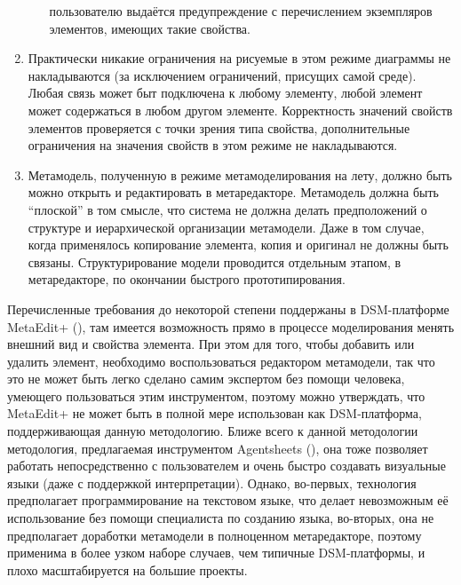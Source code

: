 \begin{enumerate}
\begin{enumerate}
			пользователю выдаётся предупреждение с перечислением экземпляров элементов, имеющих 
			такие свойства.
		\end{enumerate}
	\item Практически никакие ограничения на рисуемые в этом режиме диаграммы не накладываются 
		(за исключением ограничений, присущих самой среде). Любая связь может быт подключена 
		к любому элементу, любой элемент может содержаться в любом другом элементе. Корректность 
		значений свойств элементов проверяется с точки зрения типа свойства, дополнительные 
		ограничения на значения свойств в этом режиме не накладываются.
	\item Метамодель, полученную в режиме метамоделирования на лету, должно быть можно 
		открыть и редактировать в метаредакторе. Метамодель должна быть "`плоской"' в том 
		смысле, что система не должна делать предположений о структуре и иерархической 
		организации метамодели. Даже в том случае, когда применялось копирование элемента, 
		копия и оригинал не должны быть связаны. Структурирование модели проводится отдельным 
		этапом, в метаредакторе, по окончании быстрого прототипирования.
\end{enumerate}

Перечисленные требования до некоторой степени поддержаны в DSM-платформе MetaEdit+ 
(\cite{kelly2008domain}), там имеется возможность прямо в процессе моделирования менять 
внешний вид и свойства элемента. При этом для того, чтобы добавить или удалить элемент, 
необходимо воспользоваться редактором метамодели, так что это не может быть легко 
сделано самим экспертом без помощи человека, умеющего пользоваться этим инструментом, 
поэтому можно утверждать, что MetaEdit+ не может быть в полной мере использован как 
DSM-платформа, поддерживающая данную методологию. Ближе всего к данной методологии 
методология, предлагаемая инструментом Agentsheets (\cite{repenning1995agentsheets}), 
она тоже позволяет работать непосредственно с пользователем и очень быстро создавать 
визуальные языки (даже с поддержкой интерпретации). Однако, во-первых, технология 
предполагает программирование на текстовом языке, что делает невозможным её использование 
без помощи специалиста по созданию языка, во-вторых, она не предполагает доработки метамодели 
в полноценном метаредакторе, поэтому применима в более узком наборе случаев, чем типичные 
DSM-платформы, и плохо масштабируется на большие проекты.

